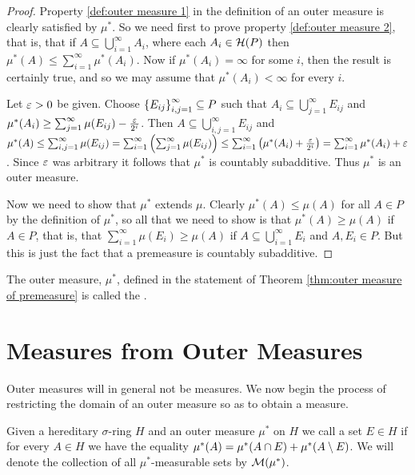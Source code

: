 \begin{proof}
Property \ref{def:outer measure 1} in the definition of an outer measure is clearly satisfied by $\mu^*$. So we need first to prove property \ref{def:outer measure 2}, that is, that if $A\subseteq\bigcup_{i=1}^\infty A_i$, where each $A_i\in{\cal H}(P)$ then $\mu^*(A)\leq\sum_{i=1}^\infty \mu^*(A_i)$. Now if $\mu^*(A_i)=\infty$ for some $i$, then the result is certainly true, and so we may assume that $\mu^*(A_i)<\infty$ for every $i$.

Let $\varepsilon>0$ be given. Choose $\left\{E_{ij}\right\}_{i, j=1}^\infty\subseteq P$ such that $A_i\subseteq\bigcup_{j=1}^\infty E_{ij}$ and $\mu^*(A_i)\geq\sum_{j=1}^\infty\mu(E_{ij})-\frac{\varepsilon}{2^i}$. Then $A\subseteq\bigcup_{i,j=1}^\infty E_{i j}$ and $\mu^*(A)\leq\sum_{i,j=1}^\infty\mu(E_{ij})=\sum_{i=1}^\infty\left(\sum_{j=1}^\infty\mu(E_{i j})\right)\leq \sum_{i=1}^\infty\left(\mu^*(A_i)+\frac{\varepsilon}{2^i}\right)\allowbreak=\sum_{i=1}^\infty\mu^*(A_i)+\varepsilon$. Since $\varepsilon$ was arbitrary it follows that $\mu^*$ is countably subadditive. Thus $\mu^*$ is an outer measure.

Now we need to show that $\mu^*$ extends $\mu$. Clearly $\mu^*(A)\leq\mu(A)$ for all $A\in P$ by the definition of $\mu^*$, so all that we need to show is that $\mu^*(A)\geq\mu(A)$ if $A\in P$, that is, that $\sum_{i=1}^\infty\mu(E_i)\geq\mu(A)$ if $A\subseteq \bigcup_{i=1}^\infty E_i$ and $A, E_i \in P$. But this is just the fact that a premeasure is countably subadditive.
\end{proof}

\begin{definition}
The outer measure, $\mu^*$, defined in the statement of Theorem \ref{thm:outer measure of premeasure} is called the .
\end{definition}

\section{Measures from Outer Measures}

Outer measures will in general not be measures. We now begin the process of restricting the domain of an outer measure so as to obtain a measure.

\begin{definition}
Given a hereditary $\sigma$-ring $H$ and an outer measure $\mu^*$ on $H$ we call a set $E\in H$  if for every $A\in H$ we have the equality $\mu^*(A)=\mu^*(A\cap E)+\mu^*(A\setminus E)$. We will denote the collection of all $\mu^*$-measurable sets by ${\cal M}(\mu^*)$.
\end{definition}

